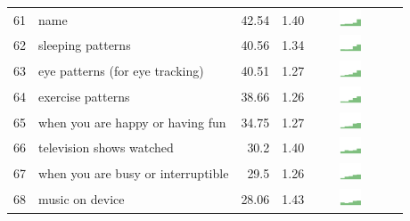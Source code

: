 \begin{table}[t]
\begin{center}
\begin{tabular}{| r | l | r | r | r | r |}
61 & name & 42.54 & 1.40 & \includegraphics[width = 2cm, height = 0.5cm]{tex-inputs/table-images/learnedyournamecombined} \\ 
62 & sleeping patterns & 40.56 & 1.34 & \includegraphics[width = 2cm, height = 0.5cm]{tex-inputs/table-images/learnedwhenandhowwellyouaresleepingcombined} \\ 
63 & eye patterns (for eye tracking) & 40.51 & 1.27 & \includegraphics[width = 2cm, height = 0.5cm]{tex-inputs/table-images/scannedyoureyetolearnyoureyepatterns(foreyetracking)combined} \\ 
64 & exercise patterns & 38.66 & 1.26 & \includegraphics[width = 2cm, height = 0.5cm]{tex-inputs/table-images/learnedwhenhowandhowmuchyouexercisecombined} \\ 
65 & when you are happy or having fun & 34.75 & 1.27 & \includegraphics[width = 2cm, height = 0.5cm]{tex-inputs/table-images/learnedwhenyouwerehappyorhavingfuncombined} \\ 
66 & television shows watched & 30.2 & 1.40 & \includegraphics[width = 2cm, height = 0.5cm]{tex-inputs/table-images/learnedwhattelevisionshowsyouwatchcombined} \\ 
67 & when you are busy or interruptible & 29.5 & 1.26 & \includegraphics[width = 2cm, height = 0.5cm]{tex-inputs/table-images/learnedwhenyouarebusyorinterruptiblecombined} \\ 
68 & music on device & 28.06 & 1.43 & \includegraphics[width = 2cm, height = 0.5cm]{tex-inputs/table-images/copiedanduploadedmusicfromyourdevicecombined} \\ 

\end{tabular}
\end{center}
\end{table}

